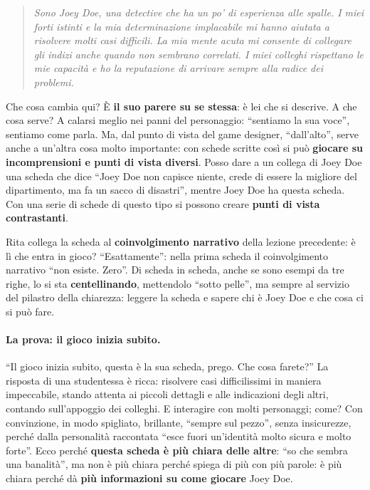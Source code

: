 \begin{quote}
\emph{Sono Joey Doe, una detective che ha un po' di esperienza alle spalle. I miei
forti istinti e la mia determinazione implacabile mi hanno aiutata a risolvere
molti casi difficili. La mia mente acuta mi consente di collegare gli indizi anche
quando non sembrano correlati. I miei colleghi rispettano le mie capacità e ho la
reputazione di arrivare sempre alla radice dei problemi.}
\end{quote}
Che cosa cambia qui? È \textbf{il suo parere su se stessa}: è lei che si descrive.
A che cosa serve? A calarsi meglio nei panni del personaggio: ``sentiamo la sua
voce'', sentiamo come parla. Ma, dal punto di vista del game designer, ``dall'alto'',
serve anche a un'altra cosa molto importante: con schede scritte così si può
\textbf{giocare su incomprensioni e punti di vista diversi}. Posso dare a un
collega di Joey Doe una scheda che dice ``Joey Doe non capisce niente, crede di
essere la migliore del dipartimento, ma fa un sacco di disastri'', mentre Joey Doe
ha questa scheda. Con una serie di schede di questo tipo si possono creare
\textbf{punti di vista contrastanti}.

Rita collega la scheda al \textbf{coinvolgimento narrativo} della lezione
precedente: è lì che entra in gioco? ``Esattamente'': nella prima scheda il
coinvolgimento narrativo ``non esiste. Zero''. Di scheda in scheda, anche se sono
esempi da tre righe, lo si sta \textbf{centellinando}, mettendolo ``sotto pelle'',
ma sempre al servizio del pilastro della chiarezza: leggere la scheda e sapere chi
è Joey Doe e che cosa ci si può fare.

\paragraph{La prova: il gioco inizia subito.} ``Il gioco inizia subito, questa è la
sua scheda, prego. Che cosa farete?'' La risposta di una studentessa è ricca:
risolvere casi difficilissimi in maniera impeccabile, stando attenta ai piccoli
dettagli e alle indicazioni degli altri, contando sull'appoggio dei colleghi. E
interagire con molti personaggi; come? Con convinzione, in modo spigliato,
brillante, ``sempre sul pezzo'', senza insicurezze, perché dalla personalità
raccontata ``esce fuori un'identità molto sicura e molto forte''. Ecco perché
\textbf{questa scheda è più chiara delle altre}: ``so che sembra una banalità'', ma
non è più chiara perché spiega di più con più parole: è più chiara perché dà
\textbf{più informazioni su come giocare} Joey Doe.

